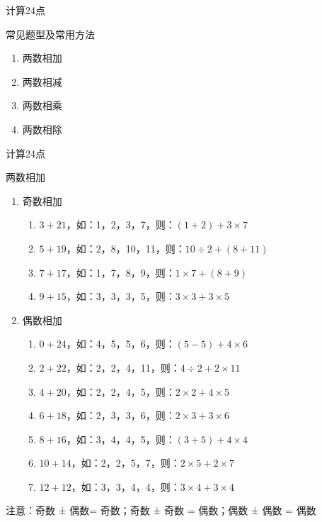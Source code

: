 \documentclass[aspectratio=169]{ctexbeamer} %
\date{\today}
\begin{document}
\begin{frame}[t]{计算24点}
\begin{spacing}{2.5}
\normalsize
\alert{常见题型及常用方法}
\begin{enumerate}[label={\arabic*.}]
\item 两数相加
\item 两数相减
\item 两数相乘
\item 两数相除
\end{enumerate}
\end{spacing}
\end{frame}

\begin{frame}[t]{计算24点}
\begin{spacing}{1.0}
\normalsize
\alert{两数相加}
\begin{enumerate}[label={\arabic*.}]
\item 奇数相加
	\begin{enumerate}[label={\Alph*.}]
	\item $3 + 21$，如：1，2，3，7，则：$(1 + 2) + 3 \times 7$
	\item $5 + 19$，如：2，8，10，11，则：$10 \div 2 + (8 + 11)$	
	\item $7 + 17$，如：1，7，8，9，则：$1 \times 7 + (8 + 9)$
	\item $9 + 15$，如：3，3，3，5，则：$3 \times 3 + 3 \times 5$
	\end{enumerate}
\item 偶数相加
	\begin{enumerate}[label={\Alph*.}]
	\item $0 + 24$，如：4，5，5，6，则：$(5 - 5) + 4 \times 6$	
	\item $2 + 22$，如：2，2，4，11，则：$4 \div 2 + 2 \times 11$	
	\item $4 + 20$，如：2，2，4，5，则：$2 \times 2 + 4 \times 5$		
	\item $6 + 18$，如：2，3，3，6，则：$2 \times 3 + 3 \times 6$
	\item $8 + 16$，如：3，4，4，5，则：$(3 + 5) + 4 \times 4$
	\item $10 + 14$，如：2，2，5，7，则：$2 \times 5 + 2 \times 7$
	\item $12 + 12$，如：3，3，4，4，则：$3 \times 4 + 3 \times 4$
	\end{enumerate}
\end{enumerate}
\alert{注意：奇数 ± 偶数= 奇数；奇数 ± 奇数 = 偶数；偶数 ± 偶数 = 偶数}
\end{spacing}
\end{frame}
\end{document}
